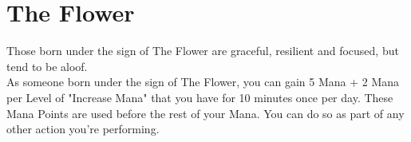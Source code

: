\section{The Flower}

Those born under the sign of The Flower are graceful, resilient and focused, but tend to be aloof.\\
As someone born under the sign of The Flower, you can gain 5 Mana + 2 Mana per Level of "Increase Mana" that you have for 10 minutes once per day. These Mana Points are used before the rest of your Mana. You can do so as part of any other action you're performing.\\